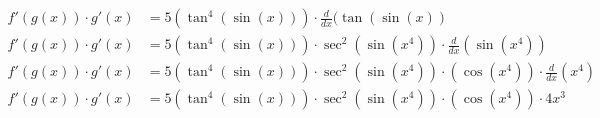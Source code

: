 \documentclass[preview]{standalone}
\begin{document}
\begin{align*}
f'(g(x)) \cdot g'(x)&=5(\tan^4(\sin(x))) \cdot \frac{d}{dx}(\tan(\sin(x)) \\ f'(g(x))\cdot g'(x)&=5(\tan^4(\sin(x))) \cdot \sec^2(\sin(x^4)) \cdot \frac{d}{dx}(\sin(x^4)) \\ f'(g(x))\cdot g'(x)&=5(\tan^4(\sin(x))) \cdot \sec^2(\sin(x^4)) \cdot (\cos(x^4)) \cdot \frac{d}{dx}(x^4) \\ f'(g(x))\cdot g'(x)&=5(\tan^4(\sin(x))) \cdot \sec^2(\sin(x^4)) \cdot (\cos(x^4)) \cdot 4x^3 \\
\end{align*}
\end{document}
